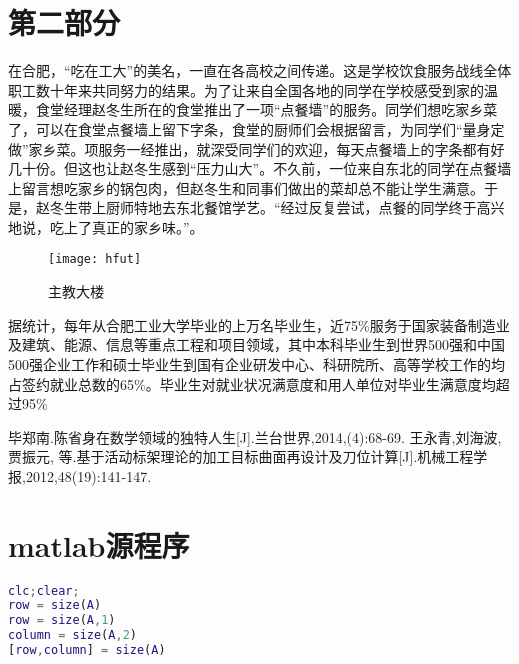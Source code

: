 \documentclass{hfutpaper}
\newcommand{\upcite}[1]{\textsuperscript{\textsuperscript{\cite{#1}}}}
\begin{document}
\section{第二部分}
在合肥，“吃在工大”的美名，一直在各高校之间传递。这是学校饮食服务战线全体职工数十年来共同努力的结果。为了让来自全国各地的同学在学校感受到家的温暖，食堂经理赵冬生所在的食堂推出了一项“点餐墙”的服务。同学们想吃家乡菜了，可以在食堂点餐墙上留下字条，食堂的厨师们会根据留言，为同学们“量身定做”家乡菜。项服务一经推出，就深受同学们的欢迎，每天点餐墙上的字条都有好几十份。但这也让赵冬生感到“压力山大”。不久前，一位来自东北的同学在点餐墙上留言想吃家乡的锅包肉，但赵冬生和同事们做出的菜却总不能让学生满意。于是，赵冬生带上厨师特地去东北餐馆学艺。“经过反复尝试，点餐的同学终于高兴地说，吃上了真正的家乡味。”。
\begin{figure}[H]%
	\centering  %
	\texttt{[image: hfut]}  %
	\caption{主教大楼}  %
	\label{fig1}
\end{figure}
据统计，每年从合肥工业大学毕业的上万名毕业生，近75\%服务于国家装备制造业及建筑、能源、信息等重点工程和项目领域，其中本科毕业生到世界500强和中国500强企业工作和硕士毕业生到国有企业研发中心、科研院所、高等学校工作的均占签约就业总数的65\%。毕业生对就业状况满意度和用人单位对毕业生满意度均超过95\%\upcite{bib:two}
\begin{thebibliography}{9}%
 毕郑南.陈省身在数学领域的独特人生[J].兰台世界,2014,(4):68-69.
 王永青,刘海波,贾振元, 等.基于活动标架理论的加工目标曲面再设计及刀位计算[J].机械工程学报,2012,48(19):141-147. 
\end{thebibliography}
\section*{matlab源程序}
\begin{lstlisting}[language=matlab]
clc;clear;
row = size(A) 
row = size(A,1) 
column = size(A,2) 
[row,column] = size(A) 
\end{lstlisting}
\end{document}
